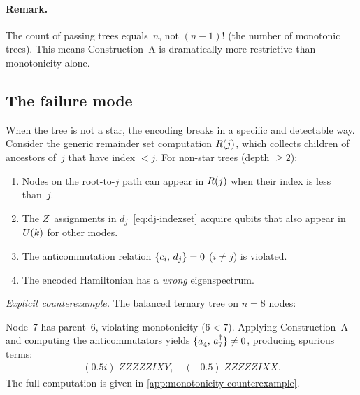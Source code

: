 \paragraph{Remark.}
The count of passing trees equals~$n$, not $(n{-}1)!$ (the number of
monotonic trees).  This means Construction~A is dramatically more
restrictive than monotonicity alone.

\subsection{The failure mode}
\label{sec:pb-failure}

When the tree is not a star, the encoding breaks in a specific and
detectable way.  Consider the generic remainder set computation
$R(j)$, which collects children of ancestors of~$j$ that have
index $< j$.  For non-star trees (depth $\ge 2$):

\begin{enumerate}
  \item Nodes on the root-to-$j$ path can appear in $R(j)$ when
    their index is less than~$j$.
  \item The $Z$~assignments in $d_j$~\eqref{eq:dj-indexset}
    acquire qubits that also appear in $U(k)$ for other modes.
  \item The anticommutation relation $\{c_i,\,d_j\} = 0$
    ($i \neq j$) is violated.
  \item The encoded Hamiltonian has a \emph{wrong} eigenspectrum.
\end{enumerate}

\textit{Explicit counterexample.}  The balanced ternary tree on
$n = 8$ nodes:
\begin{center}
\end{center}
Node~7 has parent~6, violating monotonicity ($6 < 7$).  Applying
Construction~A and computing the anticommutators yields
$\acomm{\an{4}}{\ad{7}} \neq 0$, producing spurious terms:
\begin{align*}
  (0.5i)\; ZZZZZIXY, \quad (-0.5)\; ZZZZZIXX.
\end{align*}
The full computation is given in \cref{app:monotonicity-counterexample}.

